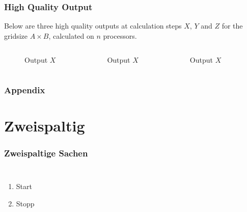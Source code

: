 \documentclass[8pt]{beamer}
\begin{document}
\begin{frame}
	\frametitle{High Quality Output}
	Below are three high quality outputs at calculation steps $X$, $Y$ and $Z$ for the gridsize $A \times B$, calculated on $n$ processors.
	\begin{columns}
		\begin{figure}
			\begin{center}
				\caption{Output $X$}
			\end{center}
		\end{figure}
		\begin{figure}
			\begin{center}
				\caption{Output $X$}
			\end{center}
		\end{figure}
		\begin{figure}
			\begin{center}
				\caption{Output $X$}
			\end{center}
		\end{figure}
	\end{columns}
\end{frame}


\begin{frame}
	\frametitle{Appendix}
\end{frame}






\section{Zweispaltig}
\begin{frame}
	\frametitle{Zweispaltige Sachen}
    \begin{columns}
                 \begin{enumerate}
                 \item Start
                 \item Stopp
                 \end{enumerate}
    \end{columns}
\end{frame}
\end{document}
